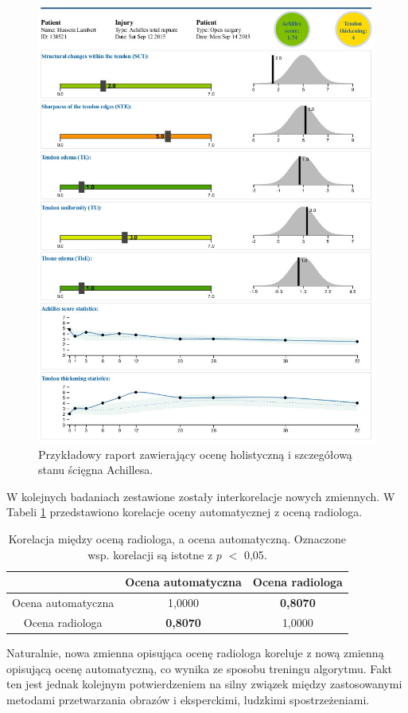\begin{figure}[]
	\centering
	\includegraphics[width=1\textwidth]{figures/raport.png}
	\caption{Przykładowy raport zawierający ocenę holistyczną i szczegółową stanu ścięgna Achillesa.}\label{fig:raport}
\end{figure}

W kolejnych badaniach zestawione zostały interkorelacje nowych zmiennych. \linebreak W Tabeli \ref{tab:gtVSpred} przedstawiono korelacje oceny automatycznej z oceną radiologa.
\begin{table}[h!]
	\centering
	\setlength{\tabcolsep}{3pt}
	\setlength\extrarowheight{2pt}
	\caption{Korelacja między oceną radiologa, a ocena automatyczną. Oznaczone wsp. korelacji są istotne z $p$ $<$ 0,05.}
	\label{tab:gtVSpred}
	\begin{tabular}{c|c|c}
		&Ocena automatyczna &Ocena radiologa \\
		\hline \hline
		Ocena automatyczna&1,0000&\textbf{0,8070}\\
		\hline
		Ocena radiologa&\textbf{0,8070}&1,0000\\
		
	\end{tabular}
\end{table}
Naturalnie, nowa zmienna opisująca ocenę radiologa koreluje z nową zmienną opisującą ocenę automatyczną, co wynika ze sposobu treningu algorytmu. Fakt ten jest jednak kolejnym potwierdzeniem na silny związek między zastosowanymi metodami przetwarzania obrazów i eksperckimi, ludzkimi spostrzeżeniami.

